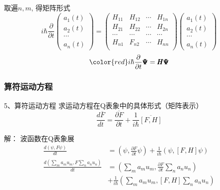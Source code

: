 \begin{frame} 
    取遍$n,m$, 得矩阵形式\\ 
    $$i\hbar \frac{\partial}{\partial t }  
    \begin{pmatrix}
        a_1(t)\\
        a_2(t)\\
        \cdots \\
        a_n(t)
    \end{pmatrix}
    =         
    \begin{pmatrix}
        H_{11} & H_{12} & \cdots & H_{1n} \\
        H_{21} & H_{22} & \cdots & H_{2n} \\
        \cdots & \cdots &  \cdots& \cdots\\
        H_{n1} & F_{n2} & \cdots & H_{nn} \\
     \end{pmatrix}
     \begin{pmatrix}
         a_1(t)\\
         a_2(t)\\
         \cdots \\
         a_n(t)
     \end{pmatrix}
    $$ \vspace{0.6em }
    $$\color{red} i\hbar \frac{\partial}{\partial t }  \pmb \Psi = \pmb H  \pmb \Psi $$
\end{frame}

\begin{frame} 
    \frametitle{算符运动方程}
    \begin{tcolorbox1}{5、算符运动方程}
        求运动方程在Q表象中的具体形式（矩阵表示）
        $$ \frac{d\overline{F}}{dt}=\overline{\frac{\partial F }{\partial t}}  +\frac{1}{i\hbar} \overline{[F,H]}$$
    \end{tcolorbox1}
    \alert{解：} 波函数在Q表象展
    \begin{equation*}
        \begin{split}
            \frac{d(\psi,F \psi )}{dt} &=(\psi,\frac{\partial F }{\partial t} \psi)  +\frac{1}{i\hbar}  ( \psi,[F,H]\psi) \\
            \frac{d(\sum_m a_m u_m,F \sum_n a_n u_n )}{dt} &=(\sum_m a_m u_m,\frac{\partial F }{\partial t} \sum_n a_n u_n) \\  
            &+\frac{1}{i\hbar}  (\sum_m a_m u_m,[F,H]\sum_n a_n u_n)  \\    
        \end{split} 
    \end{equation*}
\end{frame}

